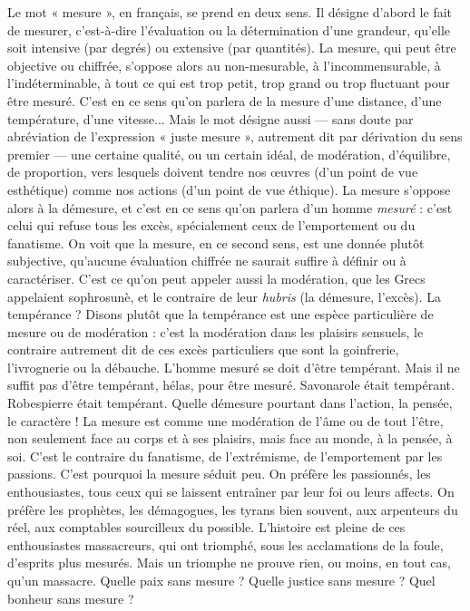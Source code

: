 Le mot « mesure », en français, se prend en deux sens. Il désigne d’abord le
fait de mesurer, c’est-à-dire l'évaluation ou la détermination d’une grandeur,
qu'elle soit intensive (par degrés) ou extensive (par quantités). La mesure, qui
peut être objective ou chiffrée, s'oppose alors au non-mesurable, à l’incommensurable,
à l’indéterminable, à tout ce qui est trop petit, trop grand ou trop fluctuant
pour être mesuré. C’est en ce sens qu’on parlera de la mesure d’une distance,
d’une température, d’une vitesse... Mais le mot désigne aussi — sans
doute par abréviation de l’expression « juste mesure », autrement dit par dérivation
du sens premier — une certaine qualité, ou un certain idéal, de modération,
d'équilibre, de proportion, vers lesquels doivent tendre nos œuvres (d’un
point de vue esthétique) comme nos actions (d’un point de vue éthique). La
mesure s'oppose alors à la démesure, et c’est en ce sens qu’on parlera d’un
homme {\it mesuré} : c'est celui qui refuse tous les excès, spécialement ceux de
l’emportement ou du fanatisme. On voit que la mesure, en ce second sens, est
une donnée plutôt subjective, qu’aucune évaluation chiffrée ne saurait suffire à
définir ou à caractériser. C’est ce qu’on peut appeler aussi la modération, que
les Grecs appelaient sophrosunè, et le contraire de leur {\it hubris} (la démesure,
l'excès). La tempérance ? Disons plutôt que la tempérance est une espèce particulière
de mesure ou de modération : c’est la modération dans les plaisirs sensuels,
le contraire autrement dit de ces excès particuliers que sont la goinfrerie,
l’ivrognerie ou la débauche. L'homme mesuré se doit d’être tempérant. Mais il
ne suffit pas d’être tempérant, hélas, pour être mesuré. Savonarole était tempérant.
Robespierre était tempérant. Quelle démesure pourtant dans l’action, la
pensée, le caractère ! La mesure est comme une modération de l’âme ou de tout
l'être, non seulement face au corps et à ses plaisirs, mais face au monde, à la
pensée, à soi. C’est le contraire du fanatisme, de l’extrémisme, de l’emportement
par les passions. C’est pourquoi la mesure séduit peu. On préfère les passionnés,
les enthousiastes, tous ceux qui se laissent entraîner par leur foi ou
leurs affects. On préfère les prophètes, les démagogues, les tyrans bien souvent,
aux arpenteurs du réel, aux comptables sourcilleux du possible. L'histoire est
pleine de ces enthousiastes massacreurs, qui ont triomphé, sous les acclamations
de la foule, d’esprits plus mesurés. Mais un triomphe ne prouve rien, ou
moins, en tout cas, qu’un massacre. Quelle paix sans mesure ? Quelle justice
sans mesure ? Quel bonheur sans mesure ?

